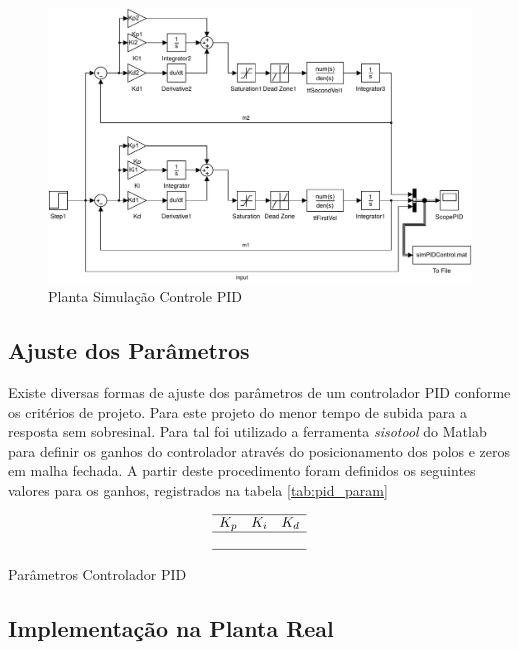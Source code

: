 \documentclass[a4paper,11pt]{article}
\begin{document}
\begin{figure}[H]
    \centering
    \includegraphics[width=1.0\linewidth]{tex/img/dcMotorControl.pdf}
    \caption{Planta Simulação Controle PID}
    \label{fig:pidControlPlant}
\end{figure}

\subsection{Ajuste dos Parâmetros}

Existe diversas formas de ajuste dos parâmetros de um controlador PID conforme os critérios de projeto. Para este projeto do menor tempo de subida para a resposta sem sobresinal. Para tal foi utilizado a ferramenta \textit{sisotool} do Matlab para definir os ganhos do controlador através do posicionamento dos polos e zeros em malha fechada. A partir deste procedimento foram definidos os seguintes valores para os ganhos, registrados na tabela \ref{tab:pid_param}

\begin{table}[H]
    \centering
    $$\begin{array}{ccc}
    \hline
        K_p & K_i & K_d\\
    \hline
         &  &\\
     \hline
    \end{array}$$
    \caption{Parâmetros Controlador PID}
    \label{tab:pid_param}
\end{table}


\subsection{Implementação na Planta Real}
\end{document}
